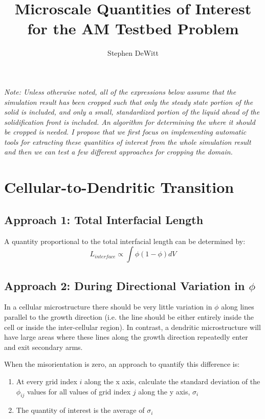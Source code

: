 \documentclass[11pt]{article}
\title{Microscale Quantities of Interest for the AM Testbed Problem}
\author{Stephen DeWitt}
\begin{document}
\maketitle

\emph{Note: Unless otherwise noted, all of the expressions below assume that the simulation result has been cropped such that only the steady state portion of the solid is included, and only a small, standardized portion of the liquid ahead of the solidification front is included. An algorithm for determining the where it should be cropped is needed. I propose that we first focus on implementing automatic tools for extracting these quantities of interest from the whole simulation result and then we can test a few different approaches for cropping the domain.}

\section{Cellular-to-Dendritic Transition}
\subsection{Approach 1: Total Interfacial Length}
A quantity proportional to the total interfacial length can be determined by:
\begin{equation}
L_{interface} \propto \int \phi (1-\phi) dV
\end{equation}

\subsection{Approach 2: During Directional Variation in $\phi$}
In a cellular microstructure there should be very little variation in $\phi$ along lines parallel to the growth direction (i.e. the line should be either entirely inside the cell or inside the inter-cellular region). In contrast, a dendritic microstructure will have large areas where these lines along the growth direction repeatedly enter and exit secondary arms.

When the misorientation is zero, an approach to quantify this difference is:
\begin{enumerate}
\item At every grid index $i$ along the x axis, calculate the standard deviation of the $\phi_{ij}$ values for all values of grid index $j$ along the y axis, $\sigma_i$
\item The quantity of interest is the average of $\sigma_i$
\end{enumerate}
\end{document}
